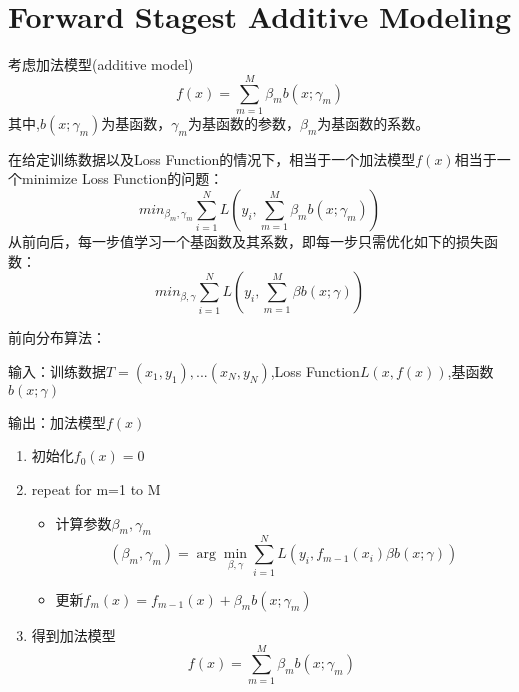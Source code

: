 \section{Forward Stagest Additive Modeling}

	考虑加法模型(additive model)\boldmath
	\begin{equation}
		f(x)=\sum_{m=1}^{M}\beta_{m}b(x;\gamma_{m})
	\end{equation}
	其中,$b(x;\gamma_{m})$为基函数，$\gamma_m$为基函数的参数，$\beta_m$为基函数的系数。

	在给定训练数据以及Loss Function的情况下，相当于一个加法模型$f(x)$相当于一个minimize Loss Function的问题：
	\begin{equation}
		min_{\beta_m,\gamma_m} \sum_{i=1}^{N}L(y_i,\sum_{m=1}^{M}\beta_{m}b(x;\gamma_{m}))
	\end{equation}
	从前向后，每一步值学习一个基函数及其系数，即每一步只需优化如下的损失函数：
	\begin{equation}
		min_{\beta,\gamma} \sum_{i=1}^{N}L(y_i,\sum_{m=1}^{M}\beta b(x;\gamma))
	\end{equation}
	\newline
	\newline

	前向分布算法：

	输入：训练数据$T={(x_1,y_1),...(x_N,y_N)}$,Loss Function$L(x,f(x))$,基函数$b(x;\gamma)$

	输出：加法模型$f(x)$

	\begin{enumerate}		
		\item 初始化$f_0(x)=0$
		\item repeat for m=1 to M
			\begin{itemize}
				\item 计算参数$\beta_m,\gamma_m$
				\begin{equation}
					(\beta_m,\gamma_m)=\arg\min_{\beta,\gamma} \sum_{i=1}^{N}L(y_i,f_{m-1}(x_i)\beta b(x;\gamma))
				\end{equation}
				\item 更新$f_m(x)=f_{m-1}(x)+\beta_m b(x;\gamma_m)$
			\end{itemize}
		\item 得到加法模型
				\begin{equation}
					f(x)=\sum_{m=1}^{M} \beta_m b(x;\gamma_m)
				\end{equation}
	\end{enumerate}